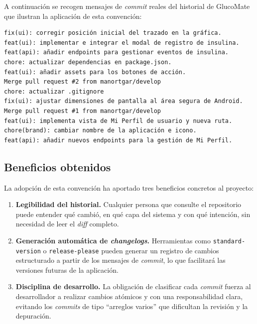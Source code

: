 A continuación se recogen mensajes de \textit{commit} reales del historial de GlucoMate
que ilustran la aplicación de esta convención:

\begin{verbatim}
fix(ui): corregir posición inicial del trazado en la gráfica.
feat(ui): implementar e integrar el modal de registro de insulina.
feat(api): añadir endpoints para gestionar eventos de insulina.
chore: actualizar dependencias en package.json.
feat(ui): añadir assets para los botones de acción.
Merge pull request #2 from manortgar/develop
chore: actualizar .gitignore
fix(ui): ajustar dimensiones de pantalla al área segura de Android.
Merge pull request #1 from manortgar/develop
feat(ui): implementa vista de Mi Perfil de usuario y nueva ruta.
chore(brand): cambiar nombre de la aplicación e icono.
feat(api): añadir nuevos endpoints para la gestión de Mi Perfil.
\end{verbatim}

\subsection{Beneficios obtenidos}

La adopción de esta convención ha aportado tres beneficios concretos al proyecto:

\begin{enumerate}
    \item \textbf{Legibilidad del historial.} Cualquier persona que consulte el
          repositorio puede entender qué cambió, en qué capa del sistema y con qué
          intención, sin necesidad de leer el \textit{diff} completo.

    \item \textbf{Generación automática de \textit{changelogs}.} Herramientas como
          \texttt{standard-version} o \texttt{release-please} pueden generar un
          registro de cambios estructurado a partir de los mensajes de \textit{commit},
          lo que facilitará las versiones futuras de la aplicación.

    \item \textbf{Disciplina de desarrollo.} La obligación de clasificar cada
          \textit{commit} fuerza al desarrollador a realizar cambios atómicos y con
          una responsabilidad clara, evitando los \textit{commits} de tipo
          ``arreglos varios'' que dificultan la revisión y la depuración.
\end{enumerate}

